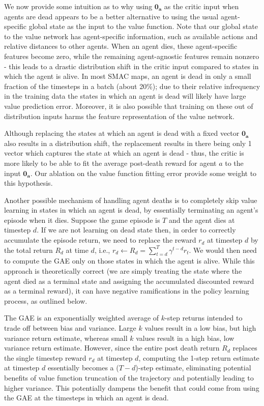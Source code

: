 We now provide some intuition as to why using $\boldsymbol{0_a}$ as the critic input when agents are dead appears to be a better alternative to using the usual agent-specific global state as the input to the value function. Note that our global state to the value network has agent-specific information, such as available actions and relative distances to other agents. When an agent dies, these agent-specific features become zero, while the remaining agent-agnostic features remain nonzero - this leads to a drastic distribution shift in the critic input compared to states in which the agent is alive. In most SMAC maps, an agent is dead in only a small fraction of the timesteps in a batch (about 20\%); due to their relative infrequency in the training data the states in which an agent is dead will likely have large value prediction error. 
Moreover, it is also possible that training on these out of distribution inputs harms the feature representation of the value network.


Although replacing the states at which an agent is dead with a fixed vector $\boldsymbol{0_a}$ also results in a distribution shift, the replacement results in there being only 1 vector which captures the state at which an agent is dead - thus, the critic is more likely to be able to fit the average post-death reward for agent $a$ to the input $\boldsymbol{0_a}$. Our ablation on the value function fitting error provide some weight to this hypothesis.


Another possible mechanism of handling agent deaths is to completely skip value learning in states in which an agent is dead, by essentially terminating an agent's episode when it dies. Suppose the game episode is $T$ and the agent dies at timestep $d$. If we are not learning on dead state then, in order to correctly accumulate the episode return, we need to replace the reward $r_d$ at timestep $d$ by the total return $R_d$ at time $d$, i.e., $r_d\gets R_d=\sum_{t=d}^T \gamma^{t-d}r_t$. We would then need to compute the GAE only on those states in which the agent is alive. While this approach is theoretically correct (we are simply treating the state where the agent died as a terminal state and assigning the accumulated discounted reward as a terminal reward), it can have negative ramifications in the policy learning process, as outlined below.

The GAE is an exponentially weighted average of $k$-step returns intended to trade off between bias and variance. Large $k$ values result in a low bias, but high variance return estimate, whereas small $k$ values result in a high bias, low variance return estimate. However, since the entire post death return $R_d$ replaces the single timestep reward $r_d$ at timestep $d$, computing the 1-step return estimate at timestep $d$ essentially becomes a ($T-d$)-step estimate, eliminating potential benefits of value function truncation of the trajectory and potentially leading to higher variance. This potentially dampens the benefit that could come from using the GAE at the timesteps in which an agent is dead. 

